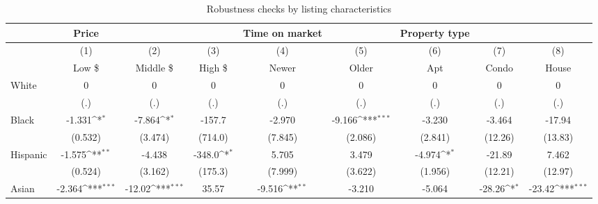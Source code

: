 {
\def\sym#1{\ifmmode^{#1}\else\(^{#1}\)\fi}
\begin{longtable}{l*{8}{c}}
\caption{Robustness checks by listing characteristics}\\
\hline\hline\endfirsthead\hline\endhead\hline\endfoot\endlastfoot

 
                    &\multicolumn{1}{c}{Price}&\multicolumn{1}{c}{}&\multicolumn{1}{c}{}&\multicolumn{1}{c}{Time on market}&\multicolumn{1}{c}{}&\multicolumn{1}{c}{Property type}&\multicolumn{1}{c}{}&\multicolumn{1}{c}{}\\
\hline                    
                    &\multicolumn{1}{c}{(1)}&\multicolumn{1}{c}{(2)}&\multicolumn{1}{c}{(3)}&\multicolumn{1}{c}{(4)}&\multicolumn{1}{c}{(5)}&\multicolumn{1}{c}{(6)}&\multicolumn{1}{c}{(7)}&\multicolumn{1}{c}{(8)}\\
                    &\multicolumn{1}{c}{Low \$}&\multicolumn{1}{c}{Middle \$}&\multicolumn{1}{c}{High \$}&\multicolumn{1}{c}{Newer}&\multicolumn{1}{c}{Older}&\multicolumn{1}{c}{Apt}&\multicolumn{1}{c}{Condo}&\multicolumn{1}{c}{House}\\
\hline
White               &           0         &           0         &           0         &           0         &           0         &           0         &           0         &           0         \\
                    &         (.)         &         (.)         &         (.)         &         (.)         &         (.)         &         (.)         &         (.)         &         (.)         \\
[1em]
Black               &      -1.331\sym{*}  &      -7.864\sym{*}  &      -157.7         &      -2.970         &      -9.166\sym{***}&      -3.230         &      -3.464         &      -17.94         \\
                    &     (0.532)         &     (3.474)         &     (714.0)         &     (7.845)         &     (2.086)         &     (2.841)         &     (12.26)         &     (13.83)         \\
[1em]
Hispanic            &      -1.575\sym{**} &      -4.438         &      -348.0\sym{*}  &       5.705         &       3.479         &      -4.974\sym{*}  &      -21.89         &       7.462         \\
                    &     (0.524)         &     (3.162)         &     (175.3)         &     (7.999)         &     (3.622)         &     (1.956)         &     (12.21)         &     (12.97)         \\
[1em]
Asian               &      -2.364\sym{***}&      -12.02\sym{***}&       35.57         &      -9.516\sym{**} &      -3.210         &      -5.064         &      -28.26\sym{*}  &      -23.42\sym{***}\\

\end{longtable}}
